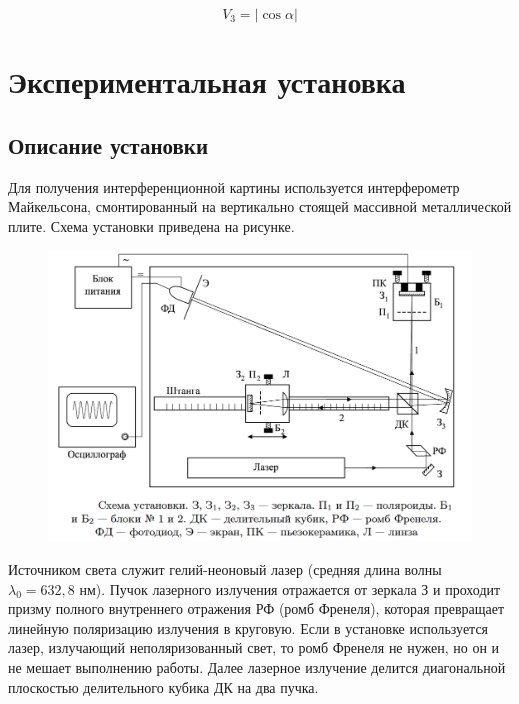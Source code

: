 \documentclass[12pt]{kiarticle}
\begin{document}
	\begin{equation}\label{}
	V_3 = |\cos{\alpha}|
	\end{equation}
	
	\section{Экспериментальная установка}
	
	\subsection{Описание установки}
	
	Для получения интерференционной картины используется интерферометр Майкельсона, смонтированный на вертикально стоящей массивной металлической плите. Схема установки приведена на рисунке.
	
\begin{figure}[h!]
		\centering
		\includegraphics[width=\linewidth]{lab.png}
		\label{lab}
\end{figure}

Источником света служит гелий-неоновый лазер (средняя длина
волны $ \lambda_0 = 632,8 $ нм). Пучок лазерного излучения отражается от зеркала З и проходит призму полного внутреннего отражения РФ (ромб Френеля), которая превращает линейную поляризацию излучения в круговую. Если в установке используется лазер, излучающий неполяризованный свет, то ромб Френеля не нужен, но он и не мешает выполнению
работы. Далее лазерное излучение делится диагональной плоскостью
делительного кубика ДК на два пучка.
\end{document}
